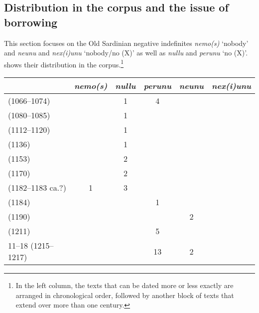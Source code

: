 \documentclass[output=paper,colorlinks,citecolor=brown]{langscibook}
\begin{document}
\subsection{Distribution in the corpus and the issue of borrowing}\label{sec:men3.1}
This section focuses on the Old Sardinian negative indefinites \textit{nemo(s)} ‘nobody’ and \textit{neunu} and \textit{nex(i)unu} ‘nobody/no (X)’ as well as \textit{nullu} and \textit{perunu} ‘no (X)’.  shows their distribution in the corpus.\footnote{In the left column, the texts that can be dated more or less exactly are arranged in chronological order, followed by another block of texts that extend over more than one century.}

\begin{table}
\small
    \begin{tabularx}{\textwidth}{Qccccc}
\lsptoprule
     & \textit{nemo(s)} & \textit{nullu} & \textit{perunu} & \textit{neunu} & \textit{nex(i)unu}  \\
    \midrule
     (1066--1074) &  & 1 & 4 &   &  \\
   
     (1080--1085) &  & 1 &  &  &  \\

     (1112--1120) &  & 1 &  &  &  \\
   
     (1136) &  & 1 &  &  &  \\

     (1153) &   & 2 &  &  &  \\

     (1170) &   & 2 &  &  &  \\

     (1182–1183 ca.?) & 1 & 3 &  &  &  \\

     (1184) &  &  & 1  &  &  \\

     (1190) &  &  &   & 2 &  \\

     (1211) &  &  & 5  &  &  \\

     11--18 (1215--1217) &  &  & 13 & 2 &  \\
  

\end{tabularx}
\end{table}
\end{document}
